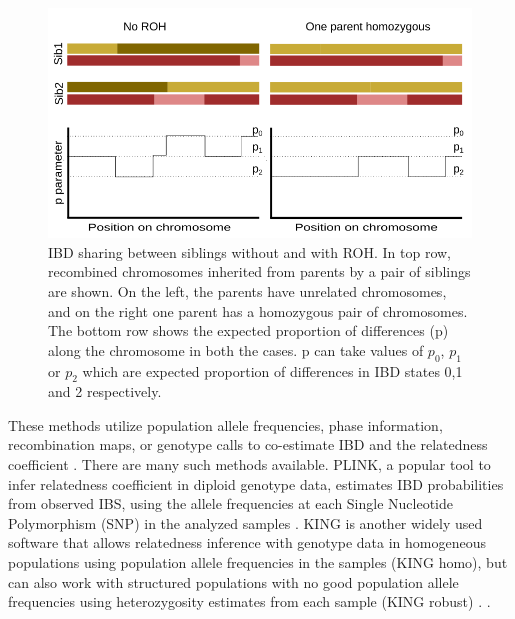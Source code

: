\documentclass[12pt, letterpaper]{article}
\begin{document}
\begin{figure}[h!]
    \includegraphics[width=18cm]{plots/inkscape_finalImg/schematic_sib.png}
    \centering
    \caption{IBD sharing between siblings without and with ROH. In top row, recombined chromosomes inherited from parents by a pair of siblings are shown. On the left, the parents have unrelated chromosomes, and on the right one parent has a homozygous pair of chromosomes. The bottom row shows the expected proportion of differences (p) along the chromosome in both the cases. p can take values of $p_0$, $p_1$ or $p_2$ which are expected proportion of differences in IBD states 0,1 and 2 respectively.  }
    \label{fig0:schematic}
\end{figure}


These methods utilize population allele frequencies, phase information, recombination maps, or genotype calls to co-estimate IBD and the relatedness coefficient \cite{huff_maximum-likelihood_2011,li_relationship_2014,li_accurate_2014,thornton_estimating_2012}. There are many such methods available. PLINK, a popular tool to infer relatedness coefficient in diploid genotype data, estimates IBD probabilities from observed IBS, using the allele frequencies at each Single Nucleotide Polymorphism (SNP) in the analyzed samples \cite{purcell_plink_2007}. KING is another widely used software that allows relatedness inference with genotype data in homogeneous populations using population allele frequencies in the samples (KING homo), but can also work with structured populations with no good population allele frequencies using heterozygosity estimates from each sample (KING robust) \cite{manichaikul_robust_2010}. . 
\end{document}
